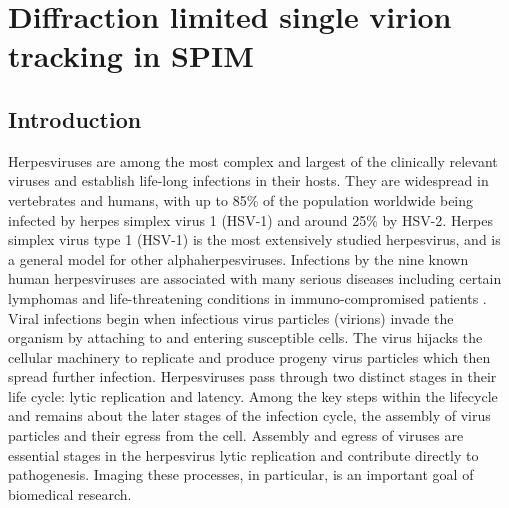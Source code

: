 \ifpdf
    \graphicspath{{Chapters/spt/Figs/Raster/}{Chapters/spt/Figs/PDF/}{Chapters/spt/Figs/}}
\else
    \graphicspath{{Chapters/spt/Figs/Vector/}{Chapters/spt/Figs/}}
\fi

\chapter{Diffraction limited single virion tracking in SPIM}\label{chapter:spt}

\section{Introduction}
Herpesviruses are among the most complex and largest of the clinically relevant viruses and establish life-long infections in their hosts.
They are widespread in vertebrates and humans, with up to 85\% of the population worldwide being infected by herpes simplex virus 1 (HSV-1) and around 25\% by HSV-2.
Herpes simplex virus type 1 (HSV-1) is the most extensively studied herpesvirus, and is a general model for other alphaherpesviruses.
Infections by the nine known human herpesviruses are associated with many serious diseases including certain lymphomas and life-threatening conditions in immuno-compromised patients \cite{[1]}.
Viral infections begin when infectious virus particles (virions) invade the organism by attaching to and entering susceptible cells.
The virus hijacks the cellular machinery to replicate and produce progeny virus particles which then spread further infection.
Herpesviruses pass through two distinct stages in their life cycle: lytic replication and latency.
Among the key steps within the lifecycle and remains about the later
stages of the infection cycle, the assembly of virus particles and their egress from the cell.
Assembly and egress of viruses are essential stages in the herpesvirus lytic replication and contribute directly to pathogenesis.
Imaging these processes, in particular, is an important goal of biomedical research.

